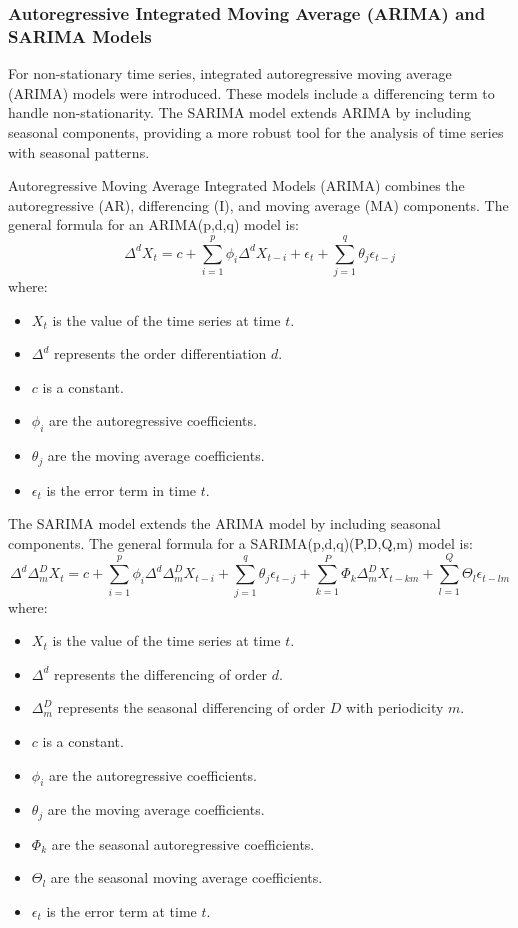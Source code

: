 \subsubsection{Autoregressive Integrated Moving Average (ARIMA) and SARIMA Models}

For non-stationary time series, integrated autoregressive moving average (ARIMA) models were introduced. These models include a differencing term to handle non-stationarity. The SARIMA model extends ARIMA by including seasonal components, providing a more robust tool for the analysis of time series with seasonal patterns.

Autoregressive Moving Average Integrated Models (ARIMA) combines the autoregressive (AR), differencing (I), and moving average (MA) components. The general formula for an ARIMA(p,d,q) model is:
\[
\Delta^d X_t = c + \sum_{i=1}^{p} \phi_i \Delta^d X_{t-i} + \epsilon_t + \sum_{j=1}^{q} \theta_j \epsilon_{t-j}
\]
where:
\begin{itemize}
    \item \( X_t \) is the value of the time series at time \( t \).
    \item \( \Delta^d \) represents the order differentiation \( d \).
    \item \( c \) is a constant.
    \item \( \phi_i \) are the autoregressive coefficients.
    \item \( \theta_j \) are the moving average coefficients.
    \item \( \epsilon_t \) is the error term in time \( t \).
\end{itemize}

The SARIMA model extends the ARIMA model by including seasonal components. The general formula for a SARIMA(p,d,q)(P,D,Q,m) model is:
\[
\Delta^d \Delta_m^D X_t = c + \sum_{i=1}^{p} \phi_i \Delta^d \Delta_m^D X_{t-i} + \sum_{j=1}^{q} \theta_j \epsilon_{t-j} + \sum_{k=1}^{P} \Phi_k \Delta_m^D X_{t-km} + \sum_{l=1}^{Q} \Theta_l \epsilon_{t-lm}
\]
where:
\begin{itemize}
    \item \( X_t \) is the value of the time series at time \( t \).
    \item \( \Delta^d \) represents the differencing of order \( d \).
    \item \( \Delta_m^D \) represents the seasonal differencing of order \( D \) with periodicity \( m \).
    \item \( c \) is a constant.
    \item \( \phi_i \) are the autoregressive coefficients.
    \item \( \theta_j \) are the moving average coefficients.
    \item \( \Phi_k \) are the seasonal autoregressive coefficients.
    \item \( \Theta_l \) are the seasonal moving average coefficients.
    \item \( \epsilon_t \) is the error term at time \( t \).
\end{itemize}

